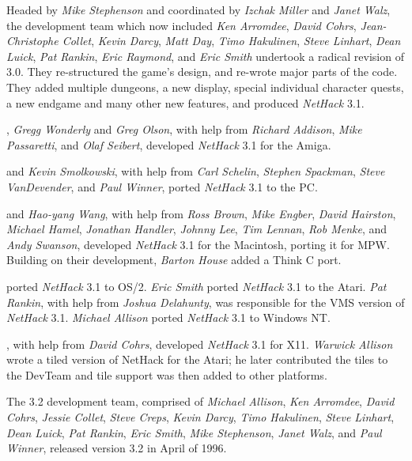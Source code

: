 \medskip
\nd Headed by {\it Mike Stephenson\/} and coordinated by {\it Izchak Miller\/} and
{\it Janet Walz}, the development team which now included {\it Ken Arromdee},
{\it David Cohrs}, {\it Jean-Christophe Collet}, {\it Kevin Darcy},
{\it Matt Day}, {\it Timo Hakulinen}, {\it Steve Linhart}, {\it Dean Luick},
{\it Pat Rankin}, {\it Eric Raymond}, and {\it Eric Smith\/} undertook a radical
revision of 3.0.  They re-structured the game's design, and re-wrote major
parts of the code.  They added multiple dungeons, a new display, special
individual character quests, a new endgame and many other new features, and
produced {\it NetHack\/} 3.1.

\medskip
{}, {\it Gregg Wonderly\/} and {\it Greg Olson}, with help
from {\it Richard Addison}, {\it Mike Passaretti}, and {\it Olaf Seibert},
developed {\it NetHack\/} 3.1 for the Amiga.

\medskip
{} and {\it Kevin Smolkowski}, with help from
{\it Carl Schelin}, {\it Stephen Spackman}, {\it Steve VanDevender},
and {\it Paul Winner}, ported {\it NetHack\/} 3.1 to the PC.

\medskip
{} and {\it Hao-yang Wang},
with help from {\it Ross Brown}, {\it Mike Engber}, {\it David Hairston},
{\it Michael Hamel}, {\it Jonathan Handler}, {\it Johnny Lee},
{\it Tim Lennan}, {\it Rob Menke}, and {\it Andy Swanson},
developed {\it NetHack\/} 3.1 for the Macintosh, porting it for MPW.
Building on their development, {\it Barton House} added a Think C port.

\medskip
{} ported {\it NetHack\/} 3.1 to OS/2.
{\it Eric Smith\/} ported {\it NetHack\/} 3.1 to the Atari.
{\it Pat Rankin}, with help from {\it Joshua Delahunty},
was responsible for the VMS version of {\it NetHack\/} 3.1.
{\it Michael Allison} ported {\it NetHack\/} 3.1 to Windows NT.

\medskip
{}, with help from {\it David Cohrs}, developed {\it NetHack\/}
3.1 for X11.
{\it Warwick Allison} wrote a tiled version of NetHack for the Atari;
he later contributed the tiles to the DevTeam and tile support was
then added to other platforms.

\medskip
\nd The 3.2 development team, comprised of {\it Michael Allison}, {\it Ken
Arromdee}, {\it David Cohrs}, {\it Jessie Collet}, {\it Steve Creps}, {\it
Kevin Darcy}, {\it Timo Hakulinen}, {\it Steve Linhart}, {\it Dean Luick},
{\it Pat Rankin}, {\it Eric Smith}, {\it Mike Stephenson}, {\it Janet Walz},
and {\it Paul Winner}, released version 3.2 in April of 1996.

